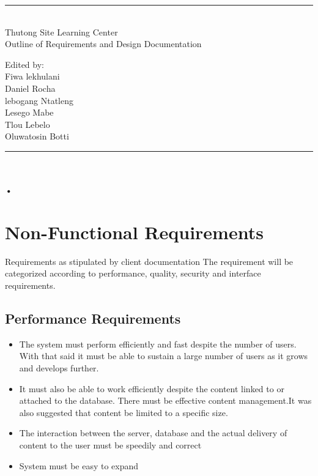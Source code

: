 \documentclass[10pt]{article}
\begin{document}
\begin{titlepage}
	\centering
	\vspace*{\fill}
	
	\vspace*{0.5cm}
	
	\huge\bfseries
	\rule{\textwidth}{1.6pt}\\[\baselineskip]
	Thutong Site Learning Center \\Outline of Requirements and Design Documentation
	
	\vspace*{0.5cm}
	
	\large Edited by: \\[\baselineskip]
	
	{Fiwa lekhulani\\Daniel Rocha\\lebogang Ntatleng\\Lesego Mabe\\Tlou Lebelo\\Oluwatosin Botti}
	
	\rule{\textwidth}{1.6pt}\\[\baselineskip]
	
	
	\vspace*{\fill}
\end{titlepage}

\newpage

\paragraph*{•}
\section*{Non-Functional Requirements} 

Requirements as stipulated by client documentation
The requirement will be categorized according to performance, quality, security and interface requirements.

\subsection*{Performance Requirements}
\begin{itemize}

\item The system must perform efficiently and fast despite the number of users. With that said it must be able to sustain a large number of users as it grows and develops further.
\item It must also be able to work efficiently despite the content linked to or attached to the database. There must be effective content management.{\newline \footnotesize It was also suggested that content be limited to a specific size.}
\item The interaction between the server, database and the actual delivery of content to the user must be speedily and correct
\item System must be easy to expand
\end{itemize}
\end{document}
